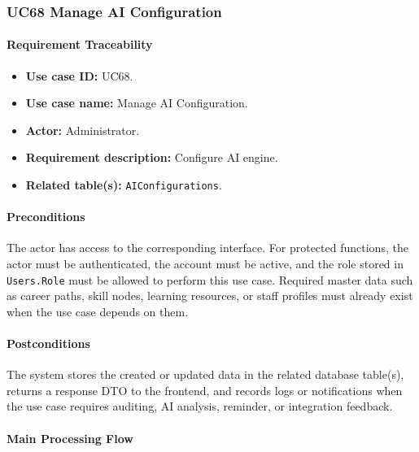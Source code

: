 \subsubsection{UC68 Manage AI Configuration}

\paragraph{Requirement Traceability}

\begin{itemize}
    \item \textbf{Use case ID:} UC68.
    \item \textbf{Use case name:} Manage AI Configuration.
    \item \textbf{Actor:} Administrator.
    \item \textbf{Requirement description:} Configure AI engine.
    \item \textbf{Related table(s):} \texttt{AIConfigurations}.
\end{itemize}

\paragraph{Preconditions}

The actor has access to the corresponding interface. For protected functions, the actor must be authenticated, the account must be active, and the role stored in \texttt{Users.Role} must be allowed to perform this use case. Required master data such as career paths, skill nodes, learning resources, or staff profiles must already exist when the use case depends on them.

\paragraph{Postconditions}

The system stores the created or updated data in the related database table(s), returns a response DTO to the frontend, and records logs or notifications when the use case requires auditing, AI analysis, reminder, or integration feedback.

\paragraph{Main Processing Flow}

